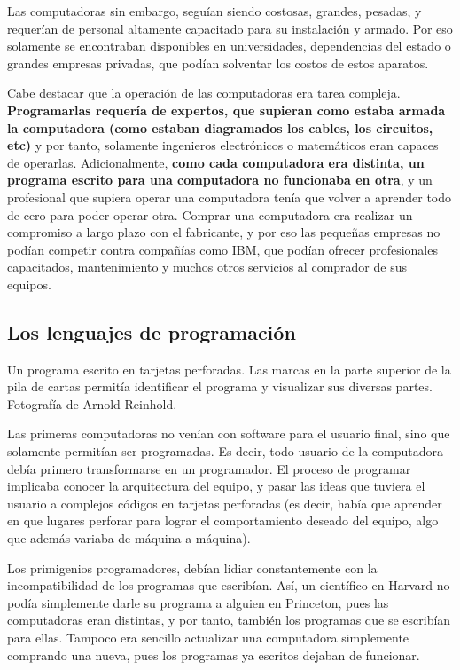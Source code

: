 Las computadoras sin embargo, seguían siendo costosas, grandes, pesadas, y
requerían de personal altamente capacitado para su instalación y armado. Por eso
solamente se encontraban disponibles en universidades, dependencias del estado o
grandes empresas privadas, que podían solventar los costos de estos aparatos.

Cabe destacar que la operación de las computadoras era tarea compleja.
\textbf{Programarlas requería de expertos, que supieran como estaba armada la
computadora (como estaban diagramados los cables, los circuitos, etc)} y por
tanto, solamente ingenieros electrónicos o matemáticos eran capaces de
operarlas. Adicionalmente, \textbf{como cada computadora era distinta, un
programa escrito para una computadora no funcionaba en otra}, y un profesional
que supiera operar una computadora tenía que volver a aprender todo de cero para
poder operar otra. Comprar una computadora era realizar un compromiso a largo
plazo con el fabricante, y por eso las pequeñas empresas no podían competir
contra compañías como IBM, que podían ofrecer profesionales capacitados,
mantenimiento y muchos otros servicios al comprador de sus equipos.

\subsection{Los lenguajes de programación}
\label{chap:historia_computadoras:subsec:lenguajes}

{Un programa escrito en tarjetas perforadas. Las marcas en la parte superior de
la pila de cartas permitía identificar el programa y visualizar sus diversas
partes.} {Fotografía de Arnold Reinhold.}

Las primeras computadoras no venían con software para el usuario final, sino que
solamente permitían ser programadas. Es decir, todo usuario de la computadora
debía primero transformarse en un programador. El proceso de programar implicaba
conocer la arquitectura del equipo, y pasar las ideas que tuviera el usuario a
complejos códigos en tarjetas perforadas (es decir, había que aprender en que
lugares perforar para lograr el comportamiento deseado del equipo, algo que
además variaba de máquina a máquina).

Los primigenios programadores, debían lidiar constantemente con la
incompatibilidad de los programas que escribían. Así, un científico en Harvard
no podía simplemente darle su programa a alguien en Princeton, pues las
computadoras eran distintas, y por tanto, también los programas que se escribían
para ellas. Tampoco era sencillo actualizar una computadora simplemente
comprando una nueva, pues los programas ya escritos dejaban de funcionar.

